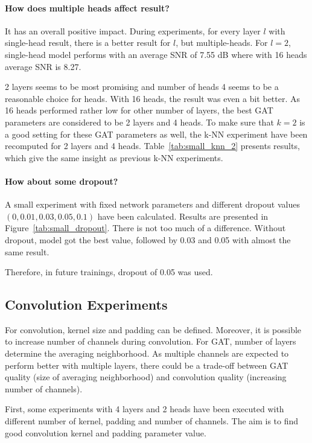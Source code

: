 \paragraph{How does multiple heads affect result?}
It has an overall positive impact. 
During experiments, for every layer $l$ with single-head result, there is a better result for $l$, but multiple-heads. 
For $l=2$, single-head model performs with an average SNR of 7.55 dB where with 16 heads average SNR is 8.27.

2 layers seems to be most promising and number of heads 4 seems to be a reasonable choice for heads.
With 16 heads, the result was even a bit better. As 16 heads performed rather low for other number of layers, 
the best GAT parameters are considered to be 2 layers and 4 heads.
To make sure that $k=2$ is a good setting for these GAT parameters as well, the k-NN experiment
have been recomputed for 2 layers and 4 heads. Table~\ref{tab:small_knn_2} presents results, which 
give the same insight as previous k-NN experiments.

\paragraph{How about some dropout?}
A small experiment with fixed network parameters
and different dropout values $(0, 0.01, 0.03, 0.05, 0.1)$ have been calculated. 
Results are presented in Figure~\ref{tab:small_dropout}.
There is not too much of a difference. Without dropout, model got the best value, followed by 
0.03 and 0.05 with almost the same result. 

Therefore, in future trainings, dropout of 0.05 was used.

\subsection{Convolution Experiments}

For convolution, kernel size and padding can be defined.
Moreover, it is possible to increase number of channels during convolution. 
For GAT, number of layers determine the averaging neighborhood.
As multiple channels are expected to perform better with multiple layers,
there could be a trade-off between GAT quality (size of averaging neighborhood) and convolution quality (increasing number of channels). 

First, some experiments with 4 layers and 2 heads have been executed with different number of kernel, padding and number of channels.
The aim is to find good convolution kernel and padding parameter value.

